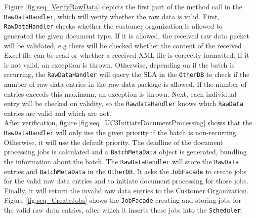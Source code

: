 \documentclass[a4paper,10pt]{article}
\begin{document}
Figure \ref{fig:seq_VerifyRawData} depicts the first part of the method call in the \texttt{RawDataHandler}, which will verify whether the raw data is valid. First, \texttt{RawDataHandler} checks whether the customer organization is allowed to generated the given document type. If it is allowed, the received raw data packet will be validated, e.g  there will be checked whether the content of the received Excel file can be read or whether a received XML file is correctly formatted. If it is not valid, an exception is thrown. Otherwise, depending on if the batch is  recurring, the \texttt{RawDataHandler} will query the SLA in the \texttt{OtherDB} to check if the number of raw data entries in the raw data package is allowed. If the number of entries exceeds this maximum, an exception is thrown. Next, each individual entry will be checked on validity, so the \texttt{RawdataHandler} knows which \texttt{RawData} entries are valid and which are not.\\

After verification, figure \ref{fig:seq_UC3InitiateDocumentProcessing} shows that the \texttt{RawDataHandler} will only use the given priority if the batch is non-recurring. Otherwise, it will use the default priority. The deadline of the document processing jobs is calculated and a \texttt{BatchMetaData} object is generated, bundling the information about the batch. The \texttt{RawDataHandler} will store the \texttt{RawData} entries and \texttt{BatchMetaData} in the \texttt{OtherDB}. It asks the \texttt{JobFacade} to create jobs for the valid raw data entries and to initiate document processing for those jobs. Finally, it will return the invalid raw data entries to the Customer Organization.\\

Figure \ref{fig:seq_CreateJobs} shows the \texttt{JobFacade} creating and storing jobs for the valid raw data entries, after which it inserts these jobs into the \texttt{Scheduler}.\\
\end{document}
